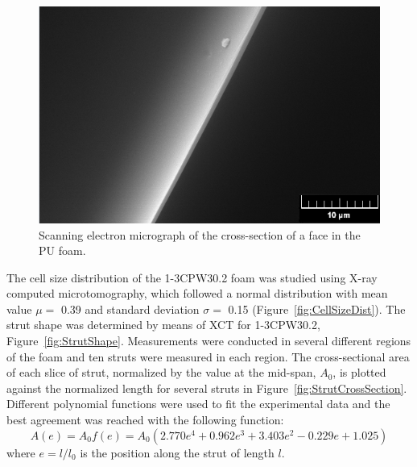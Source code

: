 \documentclass[review]{elsarticle}
\begin{document}
\begin{figure}[hb]
  \centering
  \includegraphics[scale=0.6]{FaceThickness}
  \captionsetup{justification=centering}
  \caption[Close up of \textit{Hemidactylus} sp. ]
   {Scanning electron micrograph of the cross-section of a face in the PU foam.}
   \label{fig:FaceThickness}
\end{figure}

The cell size distribution of the 1-3CPW30.2 foam was studied using X-ray computed microtomography, which followed a normal distribution with mean value $\mu=$  0.39 and standard deviation $\sigma=$ 0.15 (Figure~\ref{fig:CellSizeDist}). The strut shape was determined by means of XCT for 1-3CPW30.2, Figure~\ref{fig:StrutShape}. Measurements were conducted in several different regions of the foam and ten struts were measured in each region. The cross-sectional area of each slice of strut, normalized by the value at the mid-span, $A_0$, is plotted against the normalized length for several struts in Figure~\ref{fig:StrutCrossSection}. Different polynomial functions were used to fit the experimental data and the best agreement was reached with the following function: 
\begin{equation}
A(e)=A_0f(e)=A_0(2.770e^4+0.962e^3+3.403e^2-0.229e+1.025)
\end{equation}
\noindent where $e=l/l_0$ is the position along the strut of  length $l$\cite{Jang20081845}.
\end{document}
